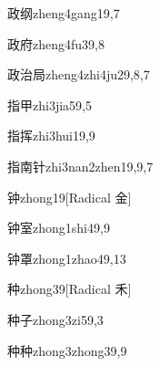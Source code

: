 \begin{verbete}{政纲}{zheng4gang1}{9,7}
\end{verbete}

\begin{verbete}{政府}{zheng4fu3}{9,8}
\end{verbete}

\begin{verbete}{政治局}{zheng4zhi4ju2}{9,8,7}
\end{verbete}

\begin{verbete}{指甲}{zhi3jia5}{9,5}
\end{verbete}

\begin{verbete}{指挥}{zhi3hui1}{9,9}
\end{verbete}

\begin{verbete}{指南针}{zhi3nan2zhen1}{9,9,7}
\end{verbete}

\begin{verbete}{钟}{zhong1}{9}[Radical 金]
\end{verbete}

\begin{verbete}{钟室}{zhong1shi4}{9,9}
\end{verbete}

\begin{verbete}{钟罩}{zhong1zhao4}{9,13}
\end{verbete}

\begin{verbete}{种}{zhong3}{9}[Radical 禾]
\end{verbete}

\begin{verbete}{种子}{zhong3zi5}{9,3}
\end{verbete}

\begin{verbete}{种种}{zhong3zhong3}{9,9}
\end{verbete}

